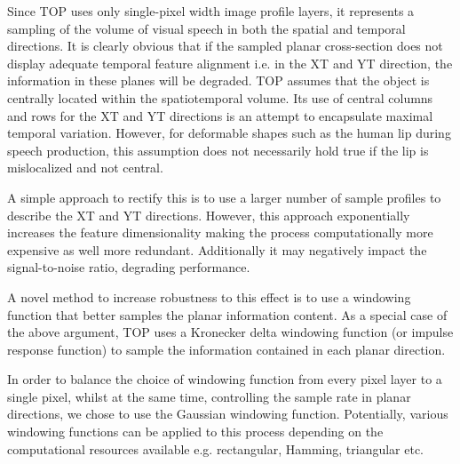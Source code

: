\documentclass[a4paper, 10pt, conference]{ieeeconf}      %
\begin{document}
Since TOP uses only single-pixel width image profile layers, it represents a sampling of the volume of visual speech in both the spatial and temporal directions. 
It is clearly obvious that if the sampled planar cross-section does not display adequate temporal feature alignment i.e. in the XT and YT direction, the information in these planes will be degraded.
TOP assumes that the object is centrally located within the spatiotemporal volume.
Its use of central columns and rows for the XT and YT directions is an attempt to encapsulate maximal temporal variation.
However, for deformable shapes such as the human lip during speech production, this assumption does not necessarily hold true if the lip is mislocalized and not central.

A simple approach to rectify this is to use a larger number of sample profiles to describe the XT and YT directions. 
However, this approach exponentially increases the feature dimensionality making the process computationally more expensive as well more redundant.
Additionally it may negatively impact the signal-to-noise ratio, degrading performance. 

A novel method to increase robustness to this effect is to use a windowing function that better samples the planar information content. 
As a special case of the above argument, TOP uses a Kronecker delta windowing function (or impulse response function) to sample the information contained in each planar direction.

In order to balance the choice of windowing function from every pixel layer to a single pixel, whilst at the same time, controlling the sample rate in planar directions, we chose to use the Gaussian windowing function.
Potentially, various windowing functions can be applied to this process depending on the computational resources available e.g. rectangular, Hamming, triangular etc.
\end{document}
